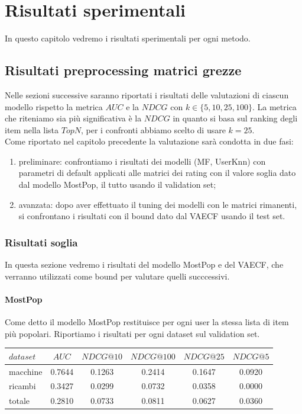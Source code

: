 \hypertarget{(chap:capitolo6)}{}
\chapter{Risultati sperimentali}
In questo capitolo vedremo i risultati sperimentali per ogni metodo.
\section{Risultati preprocessing matrici grezze}
Nelle sezioni successive saranno riportati i risultati delle valutazioni di ciascun modello rispetto la metrica $AUC$ e la $NDCG$ con $k\in \{5, 10, 25, 100\}$.
La metrica che riteniamo sia più significativa è la $NDCG$ in quanto si basa sul ranking degli item nella lista $TopN$, per i confronti abbiamo scelto di usare $k=25$.\\
Come riportato nel capitolo precedente la valutazione sarà condotta in due fasi: 
\begin{enumerate}
    \item preliminare: confrontiamo i risultati dei modelli (MF, UserKnn) con parametri di default applicati alle matrici dei rating con il valore soglia dato dal modello MostPop, il tutto usando il validation set;
    \item avanzata: dopo aver effettuato il tuning dei modelli con le matrici rimanenti, si confrontano i risultati con il bound dato dal VAECF usando il test set.
\end{enumerate} 

\subsection{Risultati soglia}
In questa sezione vedremo i risultati del modello MostPop e del VAECF, che verranno utilizzati come bound per valutare quelli succcessivi. 

\subsubsection{MostPop}
Come detto il modello MostPop restituisce per ogni user la stessa lista di item più popolari.
Riportiamo i risultati per ogni dataset sul validation set.\\

\begin{tabular}{|l|c|cccc|}
    \toprule
    $dataset$ &    $AUC$ &  $NDCG@10$ & $NDCG@100$  & $NDCG@25$ & $NDCG@5$  \\
    \midrule
    macchine & 0.7644 & 0.1263 &   0.2414 &  0.1647 & 0.0920 \\
    ricambi  & 0.3427 &  0.0299 &   0.0732 &  0.0358 & 0.0000 \\
    totale  & 0.2810 &  0.0733 &   0.0811 &  0.0627 & 0.0360 \\

\bottomrule
\end{tabular}\\

